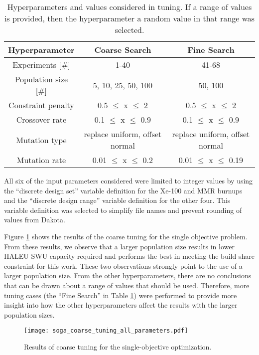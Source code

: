 \begin{table}
    \centering 
    \caption{Hyperparameters and values considered in tuning. If a range 
    of values is provided, then the hyperparameter a random value in 
    that range was selected.}
    \label{tab:soga_tuning}
    \begin{tabular}{c c c}
        \hline
        Hyperparameter & Coarse Search & Fine Search \\
        \hline 
        Experiments [\#] & 1-40 & 41-68 \\
        Population size [\#] & 5, 10, 25, 50, 100 & 50, 100\\
        Constraint penalty & 0.5 $\leq$ x $\leq$ 2 & 0.5 $\leq$ x $\leq$ 2\\
        Crossover rate & 0.1 $\leq$ x $\leq$ 0.9 & 0.1 $\leq$ x $\leq$ 0.9\\
        Mutation type & replace uniform, offset normal & replace uniform, offset normal\\
        Mutation rate & 0.01 $\leq$ x $\leq$ 0.2 & 0.01 $\leq$ x $\leq$ 0.19\\
        \hline       
    \end{tabular}
\end{table}

All six of the input parameters considered were limited to integer
values by using the ``discrete design set'' variable definition for the 
Xe-100 and \gls{MMR} burnups and the ``discrete design range'' variable 
definition for the other four. This variable definition was selected to 
simplify file names and prevent rounding of values from Dakota.


Figure \ref{fig:soga_coarse_tuning} shows the results of the coarse tuning 
for the single objective problem. From these results, we observe that a 
larger population size results in lower \gls{HALEU} \gls{SWU} capacity required
and performs the best in meeting the build share constraint for this work. 
These two observations strongly point to the use of a larger population size. 
From the other hyperparameters, there are no conclusions that can be drawn 
about a range of values that should be used. 
Therefore, more tuning cases (the ``Fine Search'' in Table \ref{tab:soga_tuning})
were performed to provide more insight into how the other hyperparameters 
affect the results with the larger population sizes. 

\begin{figure}
    \texttt{[image: soga\_coarse\_tuning\_all\_parameters.pdf]}
    \caption{Results of coarse tuning for the single-objective 
    optimization.}
    \label{fig:soga_coarse_tuning}
\end{figure}

